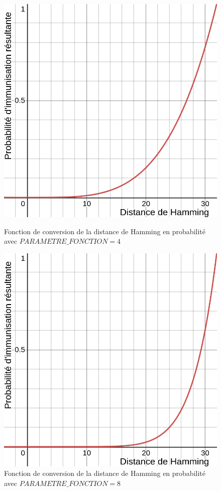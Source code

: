 \begin{figure}[h]
  \centering
    \captionsetup{justification=centering}
  \begin{minipage}[b]{0.4\textwidth}
    \includegraphics[width=\textwidth]{Images/fonction_4.png}
    \caption[Fonction de converstion en probabilité (facteur 4)]{Fonction de conversion de la distance de Hamming en probabilité avec $PARAMETRE\_FONCTION = 4$}
  \end{minipage}
  \hfill
  \begin{minipage}[b]{0.4\textwidth}
    \includegraphics[width=\textwidth]{Images/fonction_8.png}
    \caption[Fonction de converstion en probabilité (facteur 4)]{Fonction de conversion de la distance de Hamming en probabilité avec $PARAMETRE\_FONCTION = 8$}
  \end{minipage}
\end{figure}

